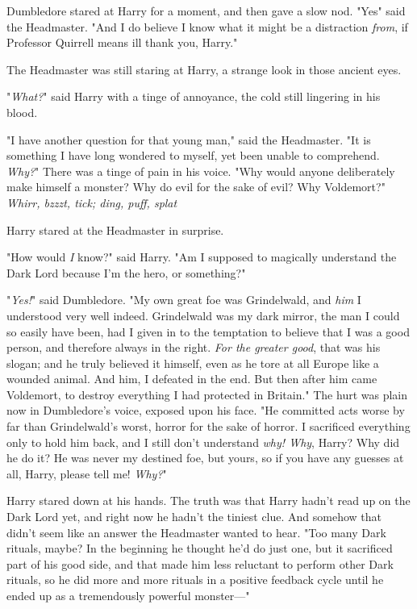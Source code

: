 Dumbledore stared at Harry for a moment, and then gave a slow nod.
"Yes{\el}" said the Headmaster. "And I do believe I know what it might be a
distraction \emph{from}, if Professor Quirrell means ill{\el} thank you,
Harry."

The Headmaster was still staring at Harry, a strange look in those ancient eyes.

"\emph{What?}" said Harry with a tinge of annoyance, the cold still lingering
in his blood.

"I have another question for that young man," said the Headmaster. "It is
something I have long wondered to myself, yet been unable to comprehend.
\emph{Why?}" There was a tinge of pain in his voice. "Why would anyone
deliberately make himself a monster? Why do evil for the sake of evil? Why
Voldemort?"
\sbreak
\emph{Whirr, bzzzt, tick; ding, puff, splat{\el}}

Harry stared at the Headmaster in surprise.

"How would \emph{I} know?" said Harry. "Am I supposed to magically understand
the Dark Lord because I'm the hero, or something?"

"\emph{Yes!}" said Dumbledore. "My own great foe was Grindelwald, and
\emph{him} I understood very well indeed. Grindelwald was my dark mirror, the
man I could so easily have been, had I given in to the temptation to believe
that I was a good person, and therefore always in the right. \emph{For the
greater good}, that was his slogan; and he truly believed it himself, even as
he tore at all Europe like a wounded animal. And him, I defeated in the end.
But then after him came Voldemort, to destroy everything I had protected in
Britain." The hurt was plain now in Dumbledore's voice, exposed upon his face.
"He committed acts worse by far than Grindelwald's worst, horror for the sake
of horror. I sacrificed everything only to hold him back, and I still don't
understand \emph{why! Why}, Harry? Why did he do it? He was never my destined
foe, but yours, so if you have any guesses at all, Harry, please tell me!
\emph{Why?}"

Harry stared down at his hands. The truth was that Harry hadn't read up on the
Dark Lord yet, and right now he hadn't the tiniest clue. And somehow that
didn't seem like an answer the Headmaster wanted to hear. "Too many Dark
rituals, maybe? In the beginning he thought he'd do just one, but it sacrificed
part of his good side, and that made him less reluctant to perform other Dark
rituals, so he did more and more rituals in a positive feedback cycle until he
ended up as a tremendously powerful monster\mbox{---}"

